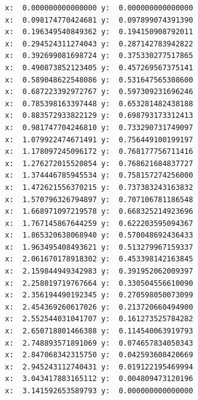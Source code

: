 \documentclass[14pt, russian]{scrartcl}
\begin{document}
\vspace{0.5cm}
  \begin{verbatim}
x:  0.000000000000000 y:  0.000000000000000
x:  0.098174770424681 y:  0.097899074391390
x:  0.196349540849362 y:  0.194150908792011
x:  0.294524311274043 y:  0.287142783942822
x:  0.392699081698724 y:  0.375330277517865
x:  0.490873852123405 y:  0.457269567375141
x:  0.589048622548086 y:  0.531647565308600
x:  0.687223392972767 y:  0.597309231696246
x:  0.785398163397448 y:  0.653281482438188
x:  0.883572933822129 y:  0.698793173312413
x:  0.981747704246810 y:  0.733290731749097
x:  1.079922474671491 y:  0.756449100199197
x:  1.178097245096172 y:  0.768177756711416
x:  1.276272015520854 y:  0.768621684837727
x:  1.374446785945534 y:  0.758157274256000
x:  1.472621556370215 y:  0.737383243163832
x:  1.570796326794897 y:  0.707106781186548
x:  1.668971097219578 y:  0.668325214923696
x:  1.767145867644259 y:  0.622203595094367
x:  1.865320638068940 y:  0.570048692436433
x:  1.963495408493621 y:  0.513279967159337
x:  2.061670178918302 y:  0.453398142163845
x:  2.159844949342983 y:  0.391952062009397
x:  2.258019719767664 y:  0.330504556610090
x:  2.356194490192345 y:  0.270598050073099
x:  2.454369260617026 y:  0.213720660494900
x:  2.552544031041707 y:  0.161273525784282
x:  2.650718801466388 y:  0.114540063919793
x:  2.748893571891069 y:  0.074657834050343
x:  2.847068342315750 y:  0.042593608420669
x:  2.945243112740431 y:  0.019122195469994
x:  3.043417883165112 y:  0.004809473120196
x:  3.141592653589793 y:  0.000000000000000


\end{verbatim}
\end{document}
